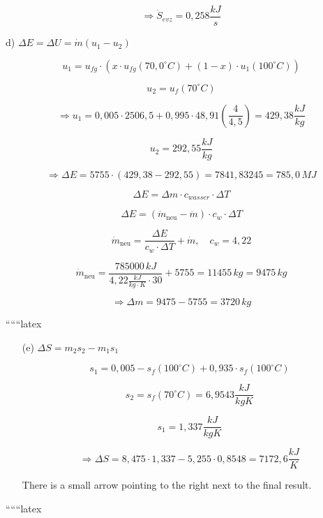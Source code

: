 \[
\Rightarrow \dot{S}_{evz} = 0,258 \frac{kJ}{s}
\]

d) $\Delta E = \Delta U = \dot{m} (u_1 - u_2)$

\[
u_1 = u_{fg} \cdot (x \cdot u_{fg}(70,0^\circ C) + (1-x) \cdot u_1(100^\circ C))
\]

\[
u_2 = u_f(70^\circ C)
\]

\[
\Rightarrow u_1 = 0,005 \cdot 2506,5 + 0,995 \cdot 48,91 \left( \frac{4}{4,5} \right) = 429,38 \frac{kJ}{kg}
\]

\[
u_2 = 292,55 \frac{kJ}{kg}
\]

\[
\Rightarrow \Delta E = 5755 \cdot (429,38 - 292,55) = 7841,83245 = 785,0 \, MJ
\]

\[
\Delta E = \Delta m \cdot c_{wasser} \cdot \Delta T
\]

\[
\Delta E = (\dot{m}_{\text{neu}} - \dot{m}) \cdot c_w \cdot \Delta T
\]

\[
\dot{m}_{\text{neu}} = \frac{\Delta E}{c_w \cdot \Delta T} + \dot{m}, \quad c_w = 4,22
\]

\[
\dot{m}_{\text{neu}} = \frac{785000 \, kJ}{4,22 \frac{kJ}{kg \cdot K} \cdot 30} + 5755 = 11455 \, kg = 9475 \, kg
\]

\[
\Rightarrow \Delta m = 9475 - 5755 = 3720 \, kg
\]

``````latex

\begin{itemize}
    \item[(e)] \(\Delta S = m_2 s_2 - m_1 s_1\)
    
    \[
    s_1 = 0{,}005 - s_f(100^\circ C) + 0{,}935 \cdot s_f(100^\circ C)
    \]
    
    \[
    s_2 = s_f(70^\circ C) = 6{,}9543 \frac{kJ}{kgK}
    \]
    
    \[
    s_1 = 1{,}337 \frac{kJ}{kgK}
    \]
    
    \[
    \Rightarrow \Delta S = 8{,}475 \cdot 1{,}337 - 5{,}255 \cdot 0{,}8548 = 7172{,}6 \frac{kJ}{K}
    \]
    
    There is a small arrow pointing to the right next to the final result.
\end{itemize}

``````latex


